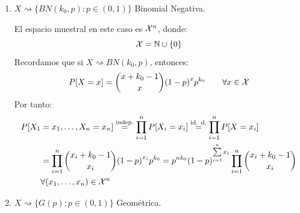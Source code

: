 \begin{ejercicio}
\begin{enumerate}[label=\alph*)]
            El espacio muestral en este caso es $\cc{X}^n$, donde:
            \begin{equation*}
                \cc{X} = \mathbb{N} \cup \{0\}
            \end{equation*} 
            Recordamos que si $X\rightsquigarrow \cc{P}(\lm)$, entonces:
            \begin{equation*}
                P[X=x] = e^{-\lm} \dfrac{\lm^x}{x!} \qquad \forall x\in \cc{X}
            \end{equation*}
            Por tanto:
            \begin{align*}
                P[X_1 &= x_1, \ldots, X_n = x_n] \stackrel{\text{indep.}}{=} \prod_{i=1}^{n}P[X_i = x_i]\stackrel{\text{id. d.}}{=} \prod_{i=1}^{n} P[X=x_i] \\
                      &= \prod_{i=1}^{n} e^{-\lm} \dfrac{\lm^{x_i}}{x_i!} = e^{-n\lm} \prod_{i=1}^{n} \dfrac{\lm^{x_i}}{x_i!} = e^{-n\lm} \cdot \dfrac{\lm^{\sum\limits_{i=1}^n x_i}}{\prod\limits_{i=1}^{n}x_i!}  \qquad \forall (x_1, \ldots, x_n) \in \cc{X}^n
            \end{align*}
        \item $X\rightsquigarrow\{BN(k_0,p) : p\in (0,1)\}$ Binomial Negativa.

            El espacio muestral en este caso es $\cc{X}^n$, donde:
            \begin{equation*}
                \cc{X} = \mathbb{N}\cup \{0\}
            \end{equation*}
            Recordamos que si $X\rightsquigarrow BN(k_0,p)$, entonces:
            \begin{equation*}
                P[X=x] = \binom{x+k_0-1}{x} {(1-p)}^{x}p^{k_0} \qquad \forall x\in \mathcal{X}
            \end{equation*}
            Por tanto:
            \begin{align*}
                P[X_1 &= x_1, \ldots, X_n = x_n] \stackrel{\text{indep.}}{=} \prod_{i=1}^{n}P[X_i = x_i]\stackrel{\text{id. d.}}{=} \prod_{i=1}^{n} P[X=x_i] \\
                      &= \prod_{i=1}^{n} \binom{x_i+k_0-1}{x_i}{(1-p)}^{x_i}p^{k_0} = p^{nk_0}{(1-p)}^{\sum\limits_{i=1}^n x_i} \prod_{i=1}^{n}\binom{x_i+k_0-1}{x_i} \\
                      &\forall (x_1,\ldots,x_n)\in \mathcal{X}^n
            \end{align*}
        \item $X\rightsquigarrow\{G(p) : p\in (0,1)\}$ Geométrica.


\end{enumerate}
\end{ejercicio}
